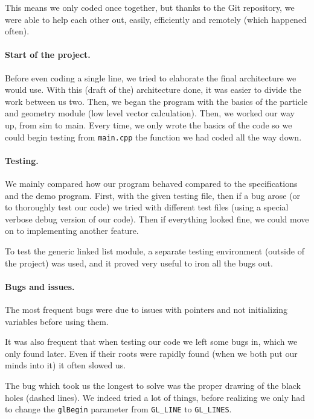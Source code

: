 \documentclass[a4paper]{article} %
\begin{document}
\begin{multicols*}{2}
This means we only coded once together, but thanks to the Git repository,
we were able to help each other out, easily, efficiently and remotely (which happened often).

\paragraph{Start of the project.} Before even coding a single line, we tried to elaborate the final
architecture we would use. With this (draft of the) architecture done, it was easier
to divide the work between us two.
Then, we began the program with the basics of the particle and geometry module (low level vector calculation).
Then, we worked our way up, from sim to main. Every time, we only wrote the basics of the code so we could begin testing from \texttt{main.cpp}
the function we had coded all the way down.

\paragraph{Testing.}
We mainly compared how our program behaved compared to the specifications and the demo program.
First, with the given testing file, then if a bug arose (or to thoroughly test our code)
we tried with different test files (using a special verbose debug version of our code).
Then if everything looked fine, we could move on to implementing another feature.

To test the generic linked list module, a separate testing environment (outside of the project)
was used, and it proved very useful to iron all the bugs out.

\paragraph{Bugs and issues.}
The most frequent bugs were due to issues with pointers and not initializing variables before using them.

It was also frequent that when testing our code we left some bugs in, which we only found later.
Even if their roots were rapidly found (when we both put our minds into it) it often slowed us.

The bug which took us the longest to solve was the proper drawing of the black holes (dashed lines).
We indeed tried a lot of things, before realizing we only had to change the \texttt{glBegin} parameter from \texttt{GL\_LINE} to \texttt{GL\_LINES}.



\end{multicols*}
\end{document}
